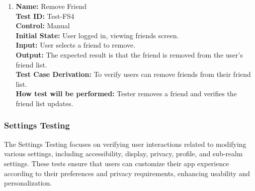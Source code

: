 \documentclass[12pt, titlepage]{article}
\begin{document}
\begin{enumerate}
  \item \textbf{Name:} {Remove Friend} \label{itm:Test-FS4}\\
        \textbf{Test ID:} Test-FS4\\
        \textbf{Control:} Manual \\
        \textbf{Initial State:} User logged in, viewing friends screen. \\
        \textbf{Input:} User selects a friend to remove. \\
        \textbf{Output:} The expected result is that the friend is removed from the user's friend list. \\
        \textbf{Test Case Derivation:} To verify users can remove friends from their friend list. \\
        \textbf{How test will be performed:} Tester removes a friend and verifies the friend list updates.

\end{enumerate}

\subsubsection{Settings Testing}
\label{sec:settings_testing}

The Settings Testing focuses on verifying user interactions related to modifying various settings, including accessibility, display, privacy, profile, and sub-realm settings. These tests ensure that users can customize their app experience according to their preferences and privacy requirements, enhancing usability and personalization.
\end{document}

